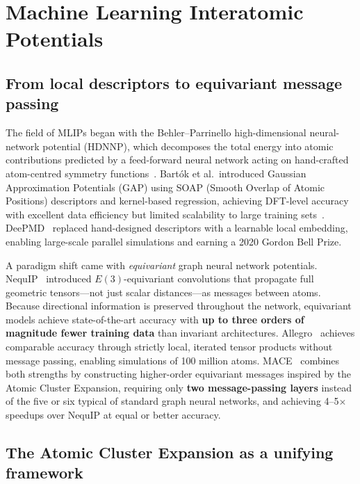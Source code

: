 \documentclass[12pt,a4paper,oneside]{book}
\begin{document}
\section{Machine Learning Interatomic Potentials}
\label{sec:mlips}

\subsection{From local descriptors to equivariant message passing}

The field of MLIPs began with the Behler--Parrinello high-dimensional neural-network potential (HDNNP), which decomposes the total energy into atomic contributions predicted by a feed-forward neural network acting on hand-crafted atom-centred symmetry functions~\cite{Behler2007}. Bart\'ok et al.\ introduced Gaussian Approximation Potentials (GAP) using SOAP (Smooth Overlap of Atomic Positions) descriptors and kernel-based regression, achieving DFT-level accuracy with excellent data efficiency but limited scalability to large training sets~\cite{Bartok2010}. DeePMD~\cite{Zhang2018} replaced hand-designed descriptors with a learnable local embedding, enabling large-scale parallel simulations and earning a 2020 Gordon Bell Prize.

A paradigm shift came with \emph{equivariant} graph neural network potentials. NequIP~\cite{Batzner2022} introduced $E(3)$-equivariant convolutions that propagate full geometric tensors---not just scalar distances---as messages between atoms. Because directional information is preserved throughout the network, equivariant models achieve state-of-the-art accuracy with \textbf{up to three orders of magnitude fewer training data} than invariant architectures. Allegro~\cite{Musaelian2023} achieves comparable accuracy through strictly local, iterated tensor products without message passing, enabling simulations of 100 million atoms. MACE~\cite{Batatia2022} combines both strengths by constructing higher-order equivariant messages inspired by the Atomic Cluster Expansion, requiring only \textbf{two message-passing layers} instead of the five or six typical of standard graph neural networks, and achieving 4--5$\times$ speedups over NequIP at equal or better accuracy.

\subsection{The Atomic Cluster Expansion as a unifying framework}
\end{document}
